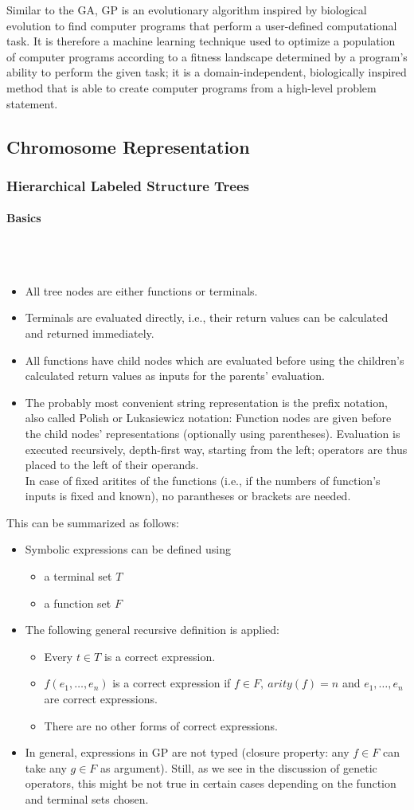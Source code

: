 \documentclass[12pt]{article}
\newcommand{\myparagraph}[1]{\paragraph{#1}\mbox{}\\\\}
\begin{document}
Similar to the GA, GP is an evolutionary algorithm inspired by biological evolution to find computer programs that perform a user-defined computational task. It is therefore a machine learning technique used to optimize a population of computer programs according to a fitness landscape determined by a program's ability to perform the given task; it is a domain-independent, biologically inspired method that is able to create computer programs from a high-level problem statement.
\subsection{Chromosome Representation}
\subsubsection{Hierarchical Labeled Structure Trees}
\myparagraph{Basics}
\begin{itemize}
\item All tree nodes are either functions or terminals.
\item Terminals are evaluated directly, i.e., their return values can be calculated and returned immediately.
\item All functions have child nodes which are evaluated before using the children's calculated return values as inputs for the parents' evaluation.
\item The probably most convenient string representation is the prefix notation, also called Polish or Lukasiewicz notation: Function nodes are given before the child nodes' representations (optionally using parentheses). Evaluation is executed recursively, depth-first way, starting from the left; operators are thus placed to the left of their operands.\\
In case of fixed aritites of the functions (i.e., if the numbers of function's inputs is fixed and known), no parantheses or brackets are needed.
\end{itemize}
This can be summarized as follows:
\begin{itemize}
\item Symbolic expressions can be defined using
\begin{itemize}
\item a terminal set $T$
\item a function set $F$
\end{itemize}
\item The following general recursive definition is applied:
\begin{itemize}
\item Every $t \in T$ is a correct expression.
\item $f(e_1,\dots,e_n)$ is a correct expression if $f \in F,\ arity(f) = n$ and $e_1,\dots,e_n$ are correct expressions.
\item There are no other forms of correct expressions.
\end{itemize}
\item In general, expressions in GP are not typed (closure property: any $f \in F$ can take any $g \in F$ as argument). Still, as we see in the discussion of genetic operators, this might be not true in certain cases depending on the function and terminal sets chosen.
\end{itemize}
\end{document}
